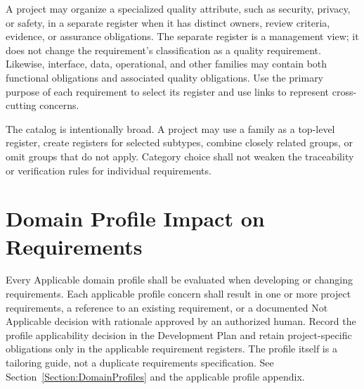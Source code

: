 A project may organize a specialized quality attribute, such as security,
privacy, or safety, in a separate register when it has distinct owners, review
criteria, evidence, or assurance obligations. The separate register is a
management view; it does not change the requirement's classification as a
quality requirement. Likewise, interface, data, operational, and other families
may contain both functional obligations and associated quality obligations. Use
the primary purpose of each requirement to select its register and use links to
represent cross-cutting concerns.

The catalog is intentionally broad. A project may use a family as a top-level
register, create registers for selected subtypes, combine closely related
groups, or omit groups that do not apply. Category choice shall not weaken the
traceability or verification rules for individual requirements.

\section{Domain Profile Impact on Requirements}
\label{Section:DomainProfileRequirements}
Every Applicable domain profile shall be evaluated when developing or changing
requirements. Each applicable profile concern shall result in one or more
project requirements, a reference to an existing requirement, or a documented
Not Applicable decision with rationale approved by an authorized human. Record
the profile applicability decision in the Development Plan and retain
project-specific obligations only in the applicable requirement registers.
The profile itself is a tailoring guide, not a duplicate requirements
specification. See Section~\ref{Section:DomainProfiles} and the applicable
profile appendix.

